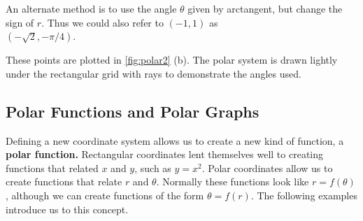 {\begin{enumerate}
\begin{enumerate}
		An alternate method is to use the angle $\theta$ given by arctangent, but change the sign of $r$. Thus we could also refer to $(-1,1)$ as\\ $(-\sqrt{2},-\pi/4)$.
	\end{enumerate}
These points are plotted in \autoref{fig:polar2} (b). The polar system is drawn lightly under the rectangular grid with rays to demonstrate the angles used.\eoehere
\end{enumerate}}

\subsection*{Polar Functions and Polar Graphs}

Defining a new coordinate system allows us to create a new kind of function, a \textbf{polar function.} Rectangular coordinates lent themselves well to creating functions that related $x$ and $y$, such as $y=x^2.$ Polar coordinates allow us to create functions that relate $r$ and $\theta$. Normally these functions look like $r=f(\theta)$, although we can create functions of the form $\theta = f(r)$. The following examples introduce us to this concept.

